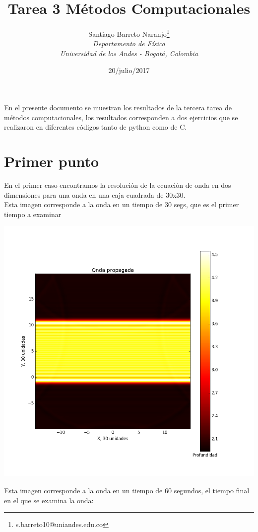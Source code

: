\documentclass{article}
\title{Tarea 3 Métodos Computacionales}
\author{Santiago Barreto Naranjo\thanks{s.barreto10@uniandes.edu.co}\\\textit{\small{Departamento de Física}}\\\textit{\small{Universidad de los Andes - Bogotá, Colombia }}}
\date{20/julio/2017}
\begin{document}
\maketitle


En el presente documento se muestran los resultados de la tercera tarea de métodos computacionales, los resultados corresponden a dos ejercicios que se realizaron en diferentes códigos tanto de python como de C. \\

\section{Primer punto}

En el primer caso encontramos la resolución de la ecuación de onda en dos dimensiones para una onda en una caja cuadrada de 30x30.\\



Esta imagen corresponde a la onda en un tiempo de 30 segs, que es el primer tiempo a examinar \\

\begin{center}
\includegraphics[scale=0.60]{t_1.png}
\end{center}

Esta imagen corresponde a la onda en un tiempo de 60 segundos, el tiempo final en el que se examina la onda:\\
\end{document}
